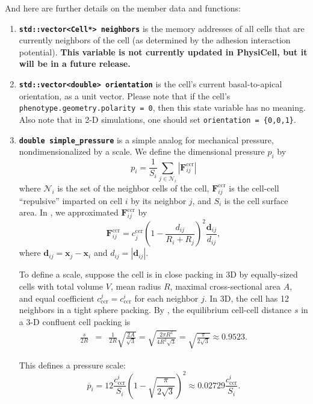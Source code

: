 \documentclass[12pt]{article}
\newcommand{\abs}[1]{\left|#1\right|}
\renewcommand{\vec}[1]{\mathbf{#1}}
\newcommand{\beq}{\begin{equation}}
\newcommand{\eeq}{\end{equation}}
\newcommand{\beqa}{\begin{eqnarray}}
\newcommand{\eeqa}{\end{eqnarray}}
\renewcommand{\v}{\verb}
\newcommand{\smallcode}[1]{\textbf{\texttt{#1}}}
\begin{document}
And here are further details on the member data and functions: 
\begin{enumerate}
\item 
\smallcode{std::vector<Cell*> neighbors} is the memory addresses of all 
cells that are currently neighbors of the cell (as determined by the 
adhesion interaction potential). 
\textbf{This variable is not currently updated in PhysiCell, but it 
will be in a future release.}

\item 
\smallcode{std::vector<double> orientation} is the cell's current 
basal-to-apical orientation, as a unit vector. Please note 
that if the cell's \v|phenotype.geometry.polarity = 0|, then 
this state variable has no meaning. Also note that in 2-D simulations, 
one should set \v|orientation = {0,0,1}|. 

\item 
\smallcode{double simple\_pressure} is a simple analog for mechanical pressure, 
nondimensionalized by a scale. We define the dimensional pressure $p_i$ by 
\beq
p_i = \frac{1}{ S_i} \sum_{ j \in \mathcal{N}_i } \abs{\vec{F}^\textrm{ccr}_{ij}}
\eeq
where $\mathcal{N}_i$ is the set of the neighbor cells of the cell, 
$\vec{F}_{ij}^\textrm{ccr}$ is the cell-cell ``repulsive'' imparted on 
cell $i$ by its neighbor $j$, and $S_i$ is the cell surface area. 
In \cite{macklin12_jtb,ref:PhysiCell}, we approximated $\vec{F}_{ij}^\textrm{ccr}$ by 
\beq
\vec{F}_{ij}^\mathrm{ccr} = 
c^\mathrm{ccr}_j \left( 1 - \frac{d_{ij}}{R_i+R_j} \right)^2 \frac{ \vec{d}_{ij} }{ d_{ij}}, 
\eeq
where $\vec{d}_{ij} = \vec{x}_j - \vec{x}_i$ and $d_{ij} = \abs{\vec{d}_{ij}}$. 
	
To define a scale, suppose the cell is in close packing in 3D by equally-sized 
cells with total volume $V$, mean radius $R$, 
 maximal cross-sectional area $A$, and equal coefficient 
 $c_\mathrm{ccr}^j = c_\mathrm{ccr}^i$ for each neighbor $j$. 
 In 3D, the cell has 12 neighbors in a tight sphere packing. By 
\cite{hyun13_jtb}, the equilibrium cell-cell distance $s$ in a 3-D confluent 
cell packing is 
\beqa
\frac{s}{2R} & = & \frac{1}{2R}\sqrt{ \frac{2A}{\sqrt{3}} }  
= 
\sqrt{ \frac{2\pi R^2}{ 4R^2 \sqrt{3}} }  
= 
\sqrt{ \frac{\pi}{2 \sqrt{3}}  } \approx 0.9523. 
\eeqa

This defines a pressure scale: 
\beq
\overline{p}_i = 12 \frac{c_\textrm{ccr}^i}{S_i} \left( 1 - \sqrt{\frac{\pi}{2\sqrt{3}}} \right)^2  \approx  
0.02729 \frac{c_\mathrm{ccr}^i}{S_i} . 
\eeq 


\end{enumerate}
\end{document}
